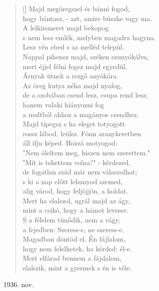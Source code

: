\documentclass[a4paper,12pt,twoside,final]{book}
\begin{document}
\begin{verse}[\versewidth]
  Majd megöregszel és bánni fogod, \\
  hogy bántasz, - azt, amire büszke vagy ma. \\
  A lelkiismeret majd bekopog \\
  s nem lesz emlék, melyben magadra hagyna. \\

  Lesz vén ebed s az melléd települ. \\
  Nappal pihensz majd, széken szunyókálva, \\
  mert éjjel félni fogsz majd egyedül. \\
  Árnyak ütnek a rezgő anyókára. \\

  Az öreg kutya néha majd nyafog, \\
  de a szobában csend lesz, csupa rend lesz; \\
  hanem valaki hiányozni fog \\
  a multból ahhoz a magányos csendhez. \\

  Majd tipegsz s ha eleget totyogott \\
  rossz lábod, leülsz. Fönn aranykeretben \\
  áll ifju képed. Hozzá motyogod: \\
  "Nem öleltem meg, hiszen nem szerettem." \\

  "Mit is tehettem volna?" - kérdezed, \\
  de fogatlan szád már nem válaszolhat; \\
  s ki a nap előtt lehunyod szemed, \\
  alig várod, hogy feljöjjön, a holdat. \\

  Mert ha elalszol, ugrál majd az ágy, \\
  mint a csikó, hogy a hámot levesse. \\
  S a félelem tünődik, nem a vágy, \\
  a fejedben: Szeress-e, ne szeress-e. \\

  Magadban döntöd el. Én fájlalom, \\
  hogy nem felelhetek, ha kérded: él-e. \\
  Mert elfárad bennem a fájdalom, \\
  elalszik, mint a gyermek s én is véle. \\
\end{verse}

1936. nov.
\end{document}
